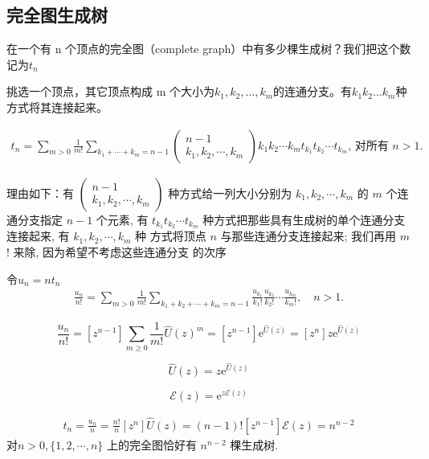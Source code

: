 \subsection{完全图生成树}

在一个有 n 个顶点的完全图（complete graph）中有多少棵生成树？我们把这个数记为$t_n$

挑选一个顶点，其它顶点构成 m 个大小为$k_1, k_2, \dots, k_m$的连通分支。有$k_1k_2...k_m$种方式将其连接起来。

\begin{align*}
    t_{n}=\sum_{m>0} \frac{1}{m !} \sum_{k_{1}+\cdots+k_{m}=n-1}\left(\begin{array}{c}
    n-1 \\
    k_{1}, k_{2}, \cdots, k_{m}
    \end{array}\right) k_{1} k_{2} \cdots k_{m} t_{k_{1}} t_{k_{2}} \cdots t_{k_{m}} \text {, 对所有 } n>1 \text {. }
\end{align*}

理由如下：有 $\left(\begin{array}{c}n-1 \\ k_{1}, k_{2}, \cdots, k_{m}\end{array}\right)$ 种方式给一列大小分别为 $k_{1}, k_{2}, \cdots, k_{m}$ 的 $m$ 个连通分支指定 $n-1$ 个元素, 有 $t_{k_{1}} t_{k_{2}} \cdots t_{k_{m}}$ 种方式把那些具有生成树的单个连通分支连接起来, 有 $k_{1}, k_{2}, \cdots, k_{m}$ 种 方式将顶点 $n$ 与那些连通分支连接起来; 我们再用 $m$ ! 来除, 因为希望不考虑这些连通分支 的次序

令$u_{n}=n t_{n}$
\setcounter{equation}{82}
\begin{align}
    \frac{u_{n}}{n !}=\sum_{m>0} \frac{1}{m !} \sum_{k_{1}+k_{2}+\cdots+k_{m}=n-1} \frac{u_{k_{1}}}{k_{1} !} \frac{u_{k_{2}}}{k_{2} !} \cdots \frac{u_{k_{m}}}{k_{m} !}, \quad n>1 .
\end{align}

$$
\frac{u_{n}}{n !}=\left[z^{n-1}\right] \sum_{m \geqslant 0} \frac{1}{m !} \hat{U}(z)^{m}=\left[z^{n-1}\right] \mathrm{e}^{\hat{U}(z)}=\left[z^{n}\right] z \mathrm{e}^{\hat{U}(z)}
$$

\begin{equation}
    \hat{U}(z)=z \mathrm{e}^{\hat{U}(z)}
\end{equation}

$$
\mathcal{E}(z)=\mathrm{e}^{z \mathcal{E}(z)}
$$

\begin{align}
    t_{n}=\frac{u_{n}}{n}=\frac{n !}{n}\left[z^{n}\right] \hat{U}(z)=(n-1) !\left[z^{n-1}\right] \mathcal{E}(z)=n^{n-2}
\end{align}
对$n>0,\{1,2, \cdots, n\}$ 上的完全图恰好有 $n^{n-2}$ 棵生成树.

